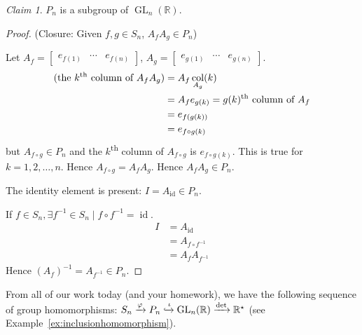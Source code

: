 \documentclass[12pt,letterpaper,DIV=11,final]{scrartcl}
\theoremstyle{plain}
\theoremstyle{definition}
\theoremstyle{remark}
\newtheorem{claim}{Claim}
\DeclareMathOperator{\id}{id}
\DeclareMathOperator{\gl}{GL} %
\DeclareMathOperator{\col}{col}
\begin{document}
\begin{claim}
  $P_n$ is a subgroup of $\gl_n(\mathbb{R})$.

  \begin{proof}
    (Closure: Given $f, g \in S_n$, $A_f A_g \in P_n$)

    Let $A_f = \begin{bmatrix}
      e_{f(1)} & \cdots & e_{f(n)}
      \end{bmatrix}$, $A_g = \begin{bmatrix}
      e_{g(1)} & \cdots & e_{g(n)}
    \end{bmatrix}$.
    \begin{align*}
      \text{(the $k$\textsuperscript{th} column of $A_f A_g$)} &= A_f \col_{A_g}(k) \\
                                                               &= A_f e_{g(k)} = \text{$g(k)$\textsuperscript{th} column of $A_f$} \\
                                                               &= e_{f(g(k))} \\
                                                               &= e_{f \circ g(k)}
    \end{align*}
    but $A_{f \circ g} \in P_n$ and the $k$\textsuperscript{th} column of $A_{f \circ g}$ is $e_{f \circ g(k)}$.
    This is true for $k = 1, 2, \dots, n$.
    Hence $A_{f \circ g} = A_f A_g$.
    Hence $A_f A_g \in P_n$.

    The identity element is present: $I = A_{\id} \in P_n$.

    If $f \in S_n, \exists f^{-1} \in S_n \mid f \circ f^{-1} = \id$.
    \begin{align*}
      I &= A_{\id} \\
        &= A_{f \circ f^{-1}} \\
        &= A_f A_{f^{-1}}
    \end{align*}
    Hence ${(A_f)}^{-1} = A_{f^{-1}} \in P_n$.
  \end{proof}
\end{claim}

From all of our work today (and your homework), we have the following sequence of group homomorphisms: $S_n \xrightarrow{\varphi} P_n \xhookrightarrow{\iota} \gl_n(\mathbb{R}) \xrightarrow{\det} \mathbb{R}^\star$
(see Example~\ref{ex:inclusionhomomorphism}).
\end{document}
